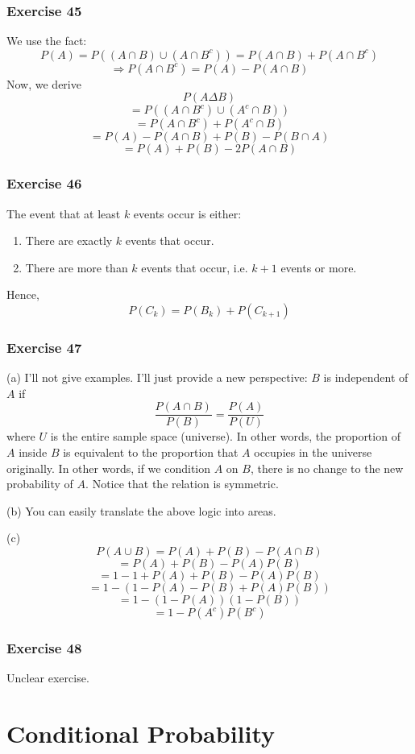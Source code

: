 \documentclass{book}
\begin{document}
\subsection*{Exercise 45}
We use the fact:
$$P(A) = P((A \cap B) \cup (A \cap B^c)) = P(A \cap B) + P(A \cap B^c)$$
$$\Rightarrow P(A \cap B^c) = P(A) - P(A \cap B)$$
Now, we derive
$$P(A \Delta B)$$
$$= P((A \cap B^c) \cup (A^c \cap B))$$
$$= P(A \cap B^c) + P(A^c \cap B)$$
$$= P(A) - P(A \cap B) + P(B) - P(B \cap A)$$
$$= P(A) + P(B) - 2P(A \cap B)$$

\subsection*{Exercise 46}
The event that at least $k$ events occur is either:
\begin{enumerate}
    \item There are exactly $k$ events that occur.
    \item There are more than $k$ events that occur, i.e. $k + 1$ events or more.
\end{enumerate}
Hence,
$$P(C_k) = P(B_k) + P(C_{k + 1})$$

\subsection*{Exercise 47}
(a) I'll not give examples. I'll just provide a new perspective: $B$ is independent of $A$ if
$$\frac{P(A \cap B)}{P(B)} = \frac{P(A)}{P(U)}$$
where $U$ is the entire sample space (universe). In other words, the proportion of $A$ inside $B$ is equivalent to the proportion that $A$ occupies in the universe originally. In other words, if we condition $A$ on $B$, there is no change to the new probability of $A$. Notice that the relation is symmetric.

\noindent
(b) You can easily translate the above logic into areas.

\noindent
(c)
$$P(A \cup B) = P(A) + P(B) - P(A \cap B)$$
$$= P(A) + P(B) - P(A)P(B)$$
$$= 1 - 1 + P(A) + P(B) - P(A)P(B)$$
$$= 1 - (1 - P(A) - P(B) + P(A)P(B))$$
$$= 1 - (1 - P(A))(1 - P(B))$$
$$= 1 - P(A^c)P(B^c)$$

\subsection*{Exercise 48}
Unclear exercise.

\chapter{Conditional Probability}
\end{document}
